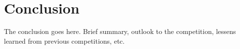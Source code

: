\section{Conclusion}
The conclusion goes here. Brief summary, outlook to the competition, lessens learned from previous competitions, etc.